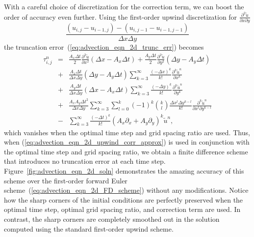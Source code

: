 \documentclass[fleqn,12pt,twoside]{article}
\newcommand{\beq}{\begin{equation}}
\newcommand{\eeq}{\end{equation}}
\newcommand{\bea}{\begin{eqnarray}}
\newcommand{\eea}{\end{eqnarray}}
\def\px{\partial x}
\def\py{\partial y}
\def\tu{\tilde{u}}
\def\dt{\Delta t}
\def\dx{\Delta x}
\def\dy{\Delta y}
\begin{document}
With a careful choice of discretization for the correction term, we can
boost the order of accuracy even further.  Using the first-order upwind 
discretization for $\frac{\partial^2 \tu}{\px \py}$
\beq
   \frac{ \left(u_{i,j} - u_{i-1,j}\right) 
        - \left(u_{i,j-1} - u_{i-1,j-1}\right)}
        {\dx \dy} 
  \label{eq:advection_eqn_2d_upwind_corr_approx}
\eeq
the truncation error~(\ref{eq:advection_eqn_2d_trunc_err}) becomes
\bea
  \tau^{n}_{i,j} &=&
      \frac{A_x \dt}{2} \frac{\partial^2 \tu}{\px^2}
      \left( \dx - A_x \dt \right)
    + \frac{A_y \dt}{2} \frac{\partial^2 \tu}{\py^2}
      \left( \dy - A_y \dt \right)
   \nonumber \\
   &+& \frac{A_x\dt}{\dx \dy} ( \dy - A_y \dt )
       \sum_{k=3}^\infty \frac{\left( -\dx \right)^k}{k!} 
              \frac{\partial^k \tu^n}{\px^k} 
   \nonumber \\
   &+& \frac{A_y\dt}{\dx \dy} ( \dx - A_x \dt )
       \sum_{k=3}^\infty \frac{\left( -\dy \right)^k}{k!} 
              \frac{\partial^k \tu^n}{\py^k} 
   \nonumber \\
   &+& \frac{A_x A_y\dt^2}{\dx \dy} 
       \sum_{k=3}^\infty \sum_{l=0}^{k}
              (-1)^k {k \choose l}
              \frac{\dx^l \dy^{k-l}}{k!} 
              \frac{\partial^k \tu^n}{\px^l \py^{k-l}} 
   \nonumber \\
   &-& \sum_{k=3}^\infty \frac{\left( -\dt \right)^k}{k!} 
       \left( A_x \partial_x + A_y \partial_y
              \right)^k \tu^{n} 
  \label{eq:advection_eqn_2d_trunc_err_mod},
\eea
which vanishes when the optimal time step and grid spacing ratio are used.
Thus, when (\ref{eq:advection_eqn_2d_upwind_corr_approx}) is used in
conjunction with the optimal time step and grid spacing ratio, we obtain
a finite difference scheme that introduces no truncation error at each time 
step.  Figure~\ref{fig:advection_eqn_2d_soln} demonstrates the amazing accuracy 
of this scheme over the first-order forward Euler 
scheme~(\ref{eq:advection_eqn_2d_FD_scheme}) without any modifications.
Notice how the sharp corners of the initial conditions are perfectly 
preserved when the optimal time step, optimal grid spacing ratio, and 
correction term are used.  In contrast, the sharp corners are
completely smoothed out in the solution computed using the standard 
first-order upwind scheme. 
\end{document}
